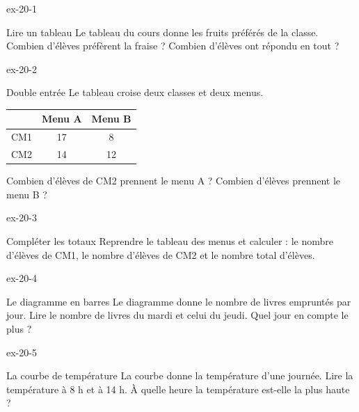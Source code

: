 \clearpage{}
\begin{blocLivre}{ex-20-1}\begin{exercice}[1]{Lire un tableau}
Le tableau du cours donne les fruits préférés de la classe. Combien d’élèves préfèrent la fraise ? Combien d’élèves ont répondu en tout ?
\end{exercice}\end{blocLivre}
\begin{blocLivre}{ex-20-2}\begin{exercice}[1]{Double entrée}
Le tableau croise deux classes et deux menus.\begin{center}\renewcommand{\arraystretch}{1.35}\begin{tabular}{c|cc}\toprule
 & Menu A & Menu B\\\midrule
CM1 & 17 & 8\\
CM2 & 14 & 12\\
\bottomrule\end{tabular}\end{center}Combien d’élèves de CM2 prennent le menu A ? Combien d’élèves prennent le menu B ?
\end{exercice}\end{blocLivre}
\begin{blocLivre}{ex-20-3}\begin{exercice}[1]{Compléter les totaux}
Reprendre le tableau des menus et calculer : le nombre d’élèves de CM1, le nombre d’élèves de CM2 et le nombre total d’élèves.
\end{exercice}\end{blocLivre}
\begin{blocLivre}{ex-20-4}\begin{exercice}[1]{Le diagramme en barres}
Le diagramme donne le nombre de livres empruntés par jour. Lire le nombre de livres du mardi et celui du jeudi. Quel jour en compte le plus ?
\label{fig-ex-20-4}
\end{exercice}\end{blocLivre}
\begin{blocLivre}{ex-20-5}\begin{exercice}[1]{La courbe de température}
La courbe donne la température d’une journée. Lire la température à 8 h et à 14 h. À quelle heure la température est-elle la plus haute ?
\label{fig-ex-20-5}
\end{exercice}\end{blocLivre}

